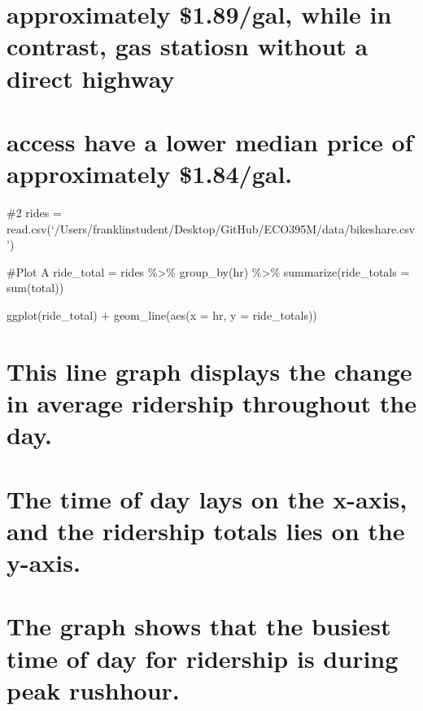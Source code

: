 \documentclass[
]{article}
\begin{document}
\hypertarget{approximately-1.89gal-while-in-contrast-gas-statiosn-without-a-direct-highway}{%
\section{approximately \$1.89/gal, while in contrast, gas statiosn
without a direct
highway}\label{approximately-1.89gal-while-in-contrast-gas-statiosn-without-a-direct-highway}}

\hypertarget{access-have-a-lower-median-price-of-approximately-1.84gal.}{%
\section{access have a lower median price of approximately
\$1.84/gal.}\label{access-have-a-lower-median-price-of-approximately-1.84gal.}}

\#2 rides =
read.csv(`/Users/franklinstudent/Desktop/GitHub/ECO395M/data/bikeshare.csv')

\#Plot A ride\_total = rides \%\textgreater\% group\_by(hr)
\%\textgreater\% summarize(ride\_totals = sum(total))

ggplot(ride\_total) + geom\_line(aes(x = hr, y = ride\_totals))

\hypertarget{this-line-graph-displays-the-change-in-average-ridership-throughout-the-day.}{%
\section{This line graph displays the change in average ridership
throughout the
day.}\label{this-line-graph-displays-the-change-in-average-ridership-throughout-the-day.}}

\hypertarget{the-time-of-day-lays-on-the-x-axis-and-the-ridership-totals-lies-on-the-y-axis.}{%
\section{The time of day lays on the x-axis, and the ridership totals
lies on the
y-axis.}\label{the-time-of-day-lays-on-the-x-axis-and-the-ridership-totals-lies-on-the-y-axis.}}

\hypertarget{the-graph-shows-that-the-busiest-time-of-day-for-ridership-is-during-peak-rushhour.}{%
\section{The graph shows that the busiest time of day for ridership is
during peak
rushhour.}\label{the-graph-shows-that-the-busiest-time-of-day-for-ridership-is-during-peak-rushhour.}}
\end{document}
